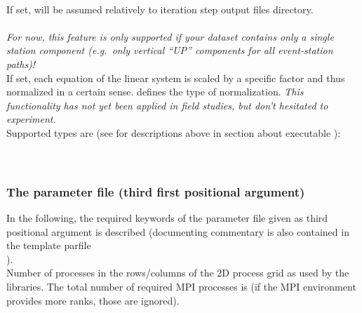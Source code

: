 \paragraph{}
If set,  will be assumed relatively to iteration step output files directory.
\paragraph{}
\emph{For now, this feature is only supported if your dataset contains only a single station component 
(e.g.\ only vertical ``UP'' components for all event-station paths)!}\\
If set, each equation of the linear system is scaled by a specific factor and thus normalized in a certain sense.
 defines the type of normalization. \emph{This 
functionality has not yet been applied in field studies, but don't hesitated to experiment.}\\
Supported types are (see for descriptions above in section about executable ):\\
\\
\\
\subsubsection{The parameter file  (third first positional argument)}
In the following, the required keywords of the parameter file given as third positional argument is described 
(documenting commentary is also contained in the template parfile\\
).
\textbf{}\\
Number of processes in the rows/columns of the 2D process grid as used by the  libraries.
The total number of required MPI processes is  (if the MPI environment 
provides more ranks, those are ignored).

